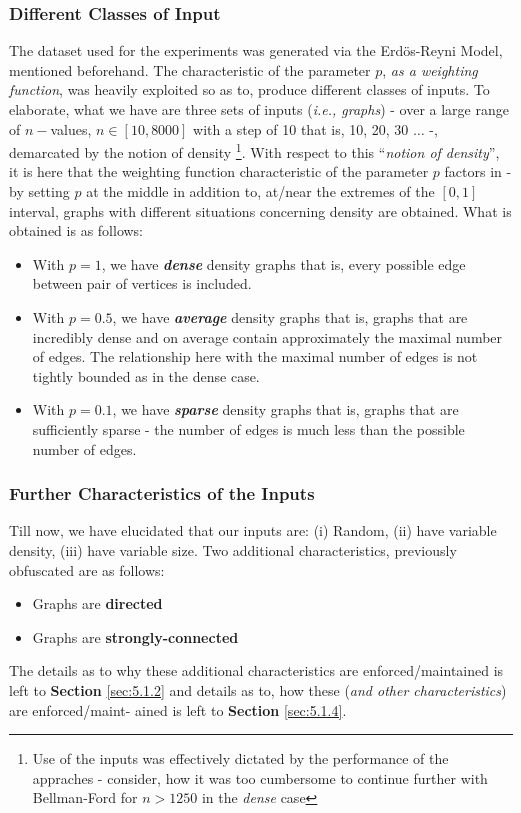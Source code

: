 \documentclass[a4paper, 12pt]{report}
\theoremstyle{definition}
\begin{document}
\subsubsection{Different Classes of Input}
The dataset used for the experiments was generated via the Erd\"{o}s-Reyni Model, mentioned beforehand. The characteristic of the parameter \(p\), \emph{as a weighting function}, was heavily exploited so as to, produce different classes of inputs.
To elaborate, what we have are three sets of inputs (\emph{i.e., graphs}) - over a large range of \(n-\)values, \(n \in [10, 8000]\) with a step of 10 that is, 10, 20, 30 \(\ldots\) -, demarcated by the notion of density 
\footnote{Use of the inputs was effectively dictated by the performance of the appraches - consider, how it was too cumbersome to continue further with Bellman-Ford for \(n > 1250\) in the \emph{dense} case}. With respect to this 
``\emph{notion of density}'', it is here that the weighting function characteristic of the parameter \(p\) factors in - by setting \(p\) at the middle in addition to, at/near the extremes of the \([0, 1]\) interval, graphs with different situations
concerning density are obtained. What is obtained is as follows:
\begin{itemize}
  \item With \(p = 1\), we have \textbf{\emph{dense}} density graphs that is, every possible edge between pair of vertices is included. \cite{erdosreyni:1960}
  \item With \(p = 0.5\), we have \textbf{\emph{average}} density graphs that is, graphs that are incredibly dense and on average contain approximately the maximal number of edges. The relationship
  here with the maximal number of edges is not tightly bounded as in the dense case. \cite{erdosreyni:1960}
  \item With \(p = 0.1\), we have \textbf{\emph{sparse}} density graphs that is, graphs that are sufficiently sparse - the number of edges is much less than the possible number of edges. \cite{cormenBk,erdosreyni:1960}
\end{itemize}

\subsubsection{Further Characteristics of the Inputs}
Till now, we have elucidated that our inputs are: (i) Random, (ii) have variable density, (iii) have variable size. Two additional characteristics, previously obfuscated are as follows:
\begin{itemize}
  \item Graphs are \textbf{directed}
  \item Graphs are \textbf{strongly-connected}
\end{itemize}
The details as to why these additional characteristics are enforced/maintained is left to \textbf{Section} \ref{sec:5.1.2} and details as to, how these (\emph{and other characteristics}) are enforced/maint- ained is left to \textbf{Section} \ref{sec:5.1.4}.
\end{document}
